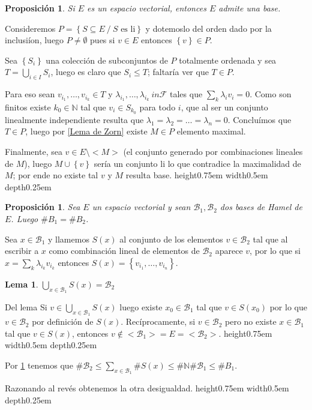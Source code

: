 \documentclass[11pt]{article}
\newcommand{\B}{\mathcal{B}}
\newcommand{\F}{\mathcal{F}}
\newcommand{\N}{{\mathbb{N}}}
\newcommand{\sett}[1]{\left\lbrace#1\right\rbrace}
\newcommand{\Bigcup}[2]{\bigcup\limits_{#1}{#2}}
\newcommand{\Bigsum}[2]{\sum\limits_{#1}{#2}}
\newtheorem{lemma}[theorem]{Lema}
\newtheorem{proposition}[theorem]{Proposici\'on}
\newenvironment{proof}[1][Demostraci\'on]{\begin{trivlist}
		\item[\hskip \labelsep {\bfseries #1}]}{\end{trivlist}}
\newcommand{\qed}{\nobreak \ifvmode \relax \else
	\ifdim\lastskip<1.5em \hskip-\lastskip
	\hskip1.5em plus0em minus0.5em \fi \nobreak
	\vrule height0.75em width0.5em depth0.25em\fi}
\begin{document}
\begin{proposition}
	Si $E$ es un espacio vectorial, entonces $E$ admite una base.
\end{proposition}

\begin{proof}
	Consideremos $P = \sett{S \subseteq E \ / \ S \text{ es li}}$ y dotemoslo del orden dado por la inclusi\'ion, luego $P \neq \emptyset$ pues si $v \in E$ entonces $\sett{v} \in P$.
	
	Sea $\sett{S_i}$ una colecci\'on de subconjuntos de $P$ totalmente ordenada y sea $T = \Bigcup{i \in I}{S_i}$, luego es claro que $S_i \leq T$; faltar\'ia ver que $T \in P$.
	
	Para eso sean $v_{i_1}, \dots, v_{i_k} \in T$ y $\lambda_{i_1},  \dots, \lambda_{i_k} \ in \F$ tales que $\Bigsum{k}{\lambda_i v_i} = 0$. Como son finitos existe $k_0 \in \N$ tal que $v_i \in S_{k_0}$ para todo $i$, que al ser un conjunto linealmente independiente resulta que $\lambda_{1} = \lambda_{2} = \dots = \lambda_{n} = 0$. Conclu\'imos que $T \in P$, luego por \ref{Lema de Zorn} existe $M \in P$ elemento maximal.
	
	Finalmente, sea $v \in E \setminus <M>$ (el conjunto generado por combinaciones lineales de $M$), luego $M \cup \sett{v}$ ser\'ia un conjunto li lo que contradice la maximalidad de $M$; por ende no existe tal $v$ y $M$ resulta base. \qed
	
	
	
\end{proof}

\begin{proposition}
	\label{Dos bases tienen mismo cardinal, Hamel}
	Sea $E$ un espacio vectorial y sean $\B_1, \B_2$ dos bases de Hamel de $E$. Luego $\#B_1 = \#B_2$.
\end{proposition}

\begin{proof}
	Sea $x \in \B_1$ y llamemos $S(x)$ al conjunto de los elementos $v \in \B_2$ tal que al escribir a $x$ como combinaci\'on lineal de elementos de $\B_2$ aparece $v$, por lo que si $x = \Bigsum{k}{\lambda_{i_k} v_{i_k}}$ entonces $S(x) = \sett{v_{i_1}, \dots, v_{i_n}}$.
			
	\begin{lemma}
		\label{Lema de cardinalidad de bases}
		$\Bigcup{x \in \B_1}{S(x)} = \B_2$
	\end{lemma}
	\begin{proof}{Del lema}
		Si $v \in \Bigcup{x \in \B_1}{S(x)}$ luego existe $x_0 \in \B_1$ tal que $v \in S(x_0)$ por lo que $v \in \B_2$ por definici\'on de $S(x)$. Rec\'iprocamente, si $v \in \B_2$ pero no existe $x \in \B_1$ tal que $v \in S(x)$, entonces $v \not \in <\B_1> =E = <\B_2>$. \qed
	\end{proof}
	
	Por \ref{Lema de cardinalidad de bases} tenemos que $\# \B_2 \leq \Bigsum{x \in \B_1}{\#S(x)} \leq \#\N \#\B_1 \leq \#B_1$.
	
	Razonando al rev\'es obtenemos la otra desigualdad. \qed		
	
\end{proof}
\end{document}
